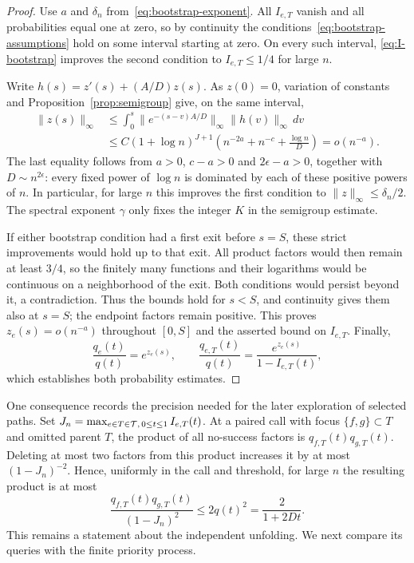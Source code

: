 \begin{proof}
Use $a$ and $\delta_n$ from~\eqref{eq:bootstrap-exponent}.
All $I_{e,T}$ vanish and all probabilities equal one at zero, so by
continuity the conditions~\eqref{eq:bootstrap-assumptions} hold on
some interval starting at zero.  On every such interval,
\eqref{eq:I-bootstrap} improves the second condition to
$I_{e,T}\le1/4$ for large $n$.

Write $h(s)=z'(s)+(A/D)z(s)$.  As $z(0)=0$, variation of constants
and Proposition~\ref{prop:semigroup} give, on the same interval,
\begin{align*}
 \lVert z(s)\rVert_\infty
 &\le\int_0^s
       \lVert e^{-(s-v)A/D}\rVert_\infty
       \lVert h(v)\rVert_\infty\,dv\\
 &\le C(1+\log n)^{J+1}
       \left(n^{-2a}+n^{-c}+\frac{\log n}{D}\right)
 =o(n^{-a}).
\end{align*}
The last equality follows from $a>0$, $c-a>0$ and
$2\epsilon-a>0$, together with $D\sim n^{2\epsilon}$: every
fixed power of $\log n$ is dominated by each of these positive powers
of $n$.  In particular, for large $n$ this improves the first
condition to $\lVert z\rVert_\infty\le\delta_n/2$.  The spectral
exponent $\gamma$ only fixes the integer $K$ in the semigroup estimate.

If either bootstrap condition had a first exit before $s=S$, these
strict improvements would hold up to that exit.  All product factors
would then remain at least $3/4$, so the finitely many functions and
their logarithms would be continuous on a neighborhood of the exit.
Both conditions would persist beyond it, a contradiction.  Thus the
bounds hold for $s<S$, and continuity gives them also at $s=S$;
the endpoint factors remain positive.  This proves
$z_e(s)=o(n^{-a})$ throughout $[0,S]$ and the asserted bound on
$I_{e,T}$.  Finally,
\[
 \frac{q_e(t)}{q(t)}=e^{z_e(s)},\qquad
 \frac{q_{e,T}(t)}{q(t)}
 =\frac{e^{z_e(s)}}{1-I_{e,T}(t)},
\]
which establishes both probability estimates.
\end{proof}

One consequence records the precision needed for the later exploration
of selected paths.  Set
$J_n=\max_{e\in T\in\mathcal T,\,0\le t\le1}I_{e,T}(t)$.
At a paired call with focus $\{f,g\}\subset T$ and omitted parent
$T$, the product of all no-success factors is
$q_{f,T}(t)q_{g,T}(t)$.  Deleting at most two factors from this
product increases it by at most $(1-J_n)^{-2}$.  Hence, uniformly
in the call and threshold, for large $n$ the resulting product is at
most
\begin{equation}\label{eq:off-pattern-bound}
 \frac{q_{f,T}(t)q_{g,T}(t)}{(1-J_n)^2}
 \le 2q(t)^2=\frac2{1+2Dt}.
\end{equation}
This remains a statement about the independent unfolding.  We next
compare its queries with the finite priority process.
